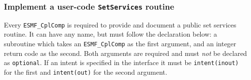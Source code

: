  
\setlength{\oldparskip}{\parskip}
\setlength{\parskip}{1.5ex}
\setlength{\oldparindent}{\parindent}
\setlength{\parindent}{0pt}
\setlength{\oldbaselineskip}{\baselineskip}
\setlength{\baselineskip}{11pt}
 
\def\bv{\begin{verbatim}}
\def\ev{\end{verbatim}}
\def\be{\begin{equation}}
\def\ee{\end{equation}}
\def\bea{\begin{eqnarray}}
\def\eea{\end{eqnarray}}
\def\bi{\begin{itemize}}
\def\ei{\end{itemize}}
\def\bn{\begin{enumerate}}
\def\en{\end{enumerate}}
\def\bd{\begin{description}}
\def\ed{\end{description}}
\def\({\left (}
\def\){\right )}
\def\[{\left [}
\def\]{\right ]}
\def\<{\left  \langle}
\def\>{\right \rangle}
\def\cI{{\cal I}}
\def\diag{\mathop{\rm diag}}
\def\tr{\mathop{\rm tr}}


 

  \subsubsection{Implement a user-code {\tt SetServices} routine}
   
   \label{sec:CplSetServ}
  
   Every {\tt ESMF\_CplComp} is required to provide and document
   a public set services routine.  It can have any name, but must
   follow the declaration below: a subroutine which takes an 
   {\tt ESMF\_CplComp} as the first argument, and 
   an integer return code as the second.
   Both arguments are required and must {\em not} be declared as 
   {\tt optional}. If an intent is specified in the interface it must be 
   {\tt intent(inout)} for the first and {\tt intent(out)} for the 
   second argument.
  
